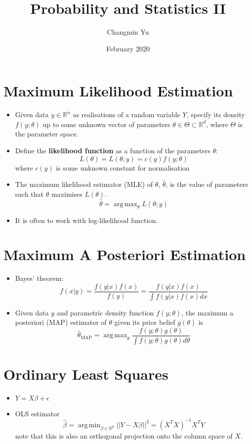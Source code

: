 \documentclass{article}
\title{Probability and Statistics II}
\author{Changmin Yu}
\date{February 2020}
\DeclareMathOperator*{\argmax}{arg\,max}
\DeclareMathOperator*{\argmin}{arg\,min}
\begin{document}
\maketitle
\section{Maximum Likelihood Estimation}
\begin{itemize}
    \item Given data $y\in\mathbb{R}^n$ as realisations of a random variable $Y$, specify its density $f(y; \theta)$ up to some unknown vector of parameters $\theta \in \Theta \subset \mathbb{R}^d$, where $\Theta$ is the parameter space.
    \item Define the \textbf{likelihood function} as a function of the parameters $\theta$:
    \begin{equation}
        L(\theta) = L(\theta; y) = c(y)f(y; \theta)
    \end{equation}
    where $c(y)$ is some unknown constant for normalisation
    \item The maximum likelihood estimator (MLE) of $\theta$, $\hat{\theta}$, is the value of parameters such that $\hat{\theta}$ maximises $L(\theta)$.
    \begin{equation}
        \hat{\theta} = \argmax_{\theta}L(\theta; y)
    \end{equation}
    \item It is often to work with log-likelihood function.
\end{itemize}
\section{Maximum A Posteriori Estimation}
\begin{itemize}
    \item Bayes' theorem:
    \begin{equation}
        f(x|y) = \frac{f(y|x)f(x)}{f(y)} = \frac{f(y|x)f(x)}{\int f(y|x)f(x)dx}
    \end{equation}
    \item Given data $y$ and parametric density function $f(y; \theta)$, the maximum a posteriori (MAP) estimator of $\theta$ given its prior belief $g(\theta)$ is
    \begin{equation}
        \hat{\theta}_{\text{MAP}} = \argmax_{\theta}\frac{f(y; \theta)g(\theta)}{\int f(y; \theta)g(\theta)d\theta}
    \end{equation}
\end{itemize}
\section{Ordinary Least Squares}
\begin{itemize}
    \item $Y = X\beta + \epsilon$
    \item OLS estimator
    \begin{equation}
        \hat{\beta} = \argmin_{\beta\in\mathbb{R}^p}||Y-X\beta||^2  = (X^TX)^{-1}X^TY
    \end{equation}
    note that this is also an orthogonal projection onto the column space of $X$.
\end{itemize}
\end{document}
